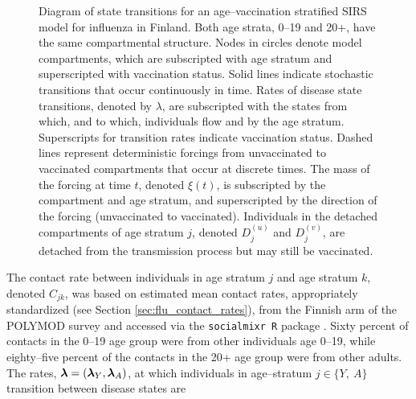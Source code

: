 \begin{figure}[htbp]
	\caption[Diagram of state transitions for an age--vaccination stratified SIRS model for influenza.]{Diagram of state transitions for an age--vaccination stratified SIRS model for influenza in Finland. Both age strata, 0--19 and 20+, have the same compartmental structure. Nodes in circles denote model compartments, which are subscripted with age stratum and superscripted with vaccination status. Solid lines indicate stochastic transitions that occur continuously in time. Rates of disease state transitions, denoted by $ \lambda $, are subscripted with the states from which, and to which, individuals flow and by the age stratum. Superscripts for transition rates indicate vaccination status. Dashed lines represent deterministic forcings from unvaccinated to vaccinated compartments that occur at discrete times. The mass of the forcing at time $ t $, denoted $ \xi(t) $, is subscripted by the compartment and age stratum, and superscripted by the direction of the forcing (unvaccinated to vaccinated). Individuals in the detached compartments of age stratum $ j $, denoted $ D_j^{(u)} $ and $ D_j^{(v)} $, are detached from the transmission process but may still be vaccinated.} 
	\label{fig:flu_sirs_diag}
\end{figure}

The contact rate between individuals in age stratum $ j $ and age stratum $ k $, denoted $ C_{jk} $, was based on estimated mean contact rates, appropriately standardized (see Section \ref{sec:flu_contact_rates}), from the Finnish arm of the POLYMOD survey \cite{mossong2008social,polymod} and accessed via the \texttt{socialmixr R} package \cite{funk2018socialmixr}. Sixty percent of contacts in the 0--19 age group were from other individuals age 0--19, while eighty--five percent of the contacts in the 20+ age group were from other adults. The rates, $ \boldsymbol{\lambda} = (\boldsymbol{\lambda}_{Y},\boldsymbol{\lambda}_{A}) $, at which individuals in age--stratum $ j \in \lbrace Y,\ A\rbrace $ transition between disease states are


